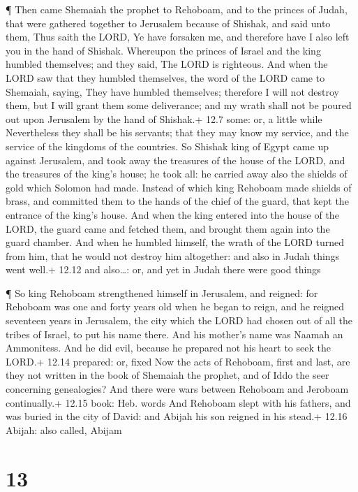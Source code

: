  ¶ Then came Shemaiah the prophet to Rehoboam, and to the
princes of Judah, that were gathered together to Jerusalem because of
Shishak, and said unto them, Thus saith the LORD, Ye have forsaken me,
and therefore have I also left you in the hand of Shishak. 
Whereupon the princes of Israel and the king humbled themselves; and
they said, The LORD is righteous.  And when the LORD saw
that they humbled themselves, the word of the LORD came to Shemaiah,
saying, They have humbled themselves; therefore I will not destroy them,
but I will grant them some deliverance; and my wrath shall not be poured
out upon Jerusalem by the hand of Shishak.+ 12.7 some: or, a little
while  Nevertheless they shall be his servants; that they
may know my service, and the service of the kingdoms of the countries.
 So Shishak king of Egypt came up against Jerusalem, and
took away the treasures of the house of the LORD, and the treasures of
the king's house; he took all: he carried away also the shields of gold
which Solomon had made.  Instead of which king Rehoboam
made shields of brass, and committed them to the hands of the chief of
the guard, that kept the entrance of the king's house.  And
when the king entered into the house of the LORD, the guard came and
fetched them, and brought them again into the guard chamber.
 And when he humbled himself, the wrath of the LORD turned
from him, that he would not destroy him altogether: and also in Judah
things went well.+ 12.12 and also\ldots: or, and yet in Judah there were
good things

 ¶ So king Rehoboam strengthened himself in Jerusalem, and
reigned: for Rehoboam was one and forty years old when he began to
reign, and he reigned seventeen years in Jerusalem, the city which the
LORD had chosen out of all the tribes of Israel, to put his name there.
And his mother's name was Naamah an Ammonitess.  And he did
evil, because he prepared not his heart to seek the LORD.+ 12.14
prepared: or, fixed  Now the acts of Rehoboam, first and
last, are they not written in the book of Shemaiah the prophet, and of
Iddo the seer concerning genealogies? And there were wars between
Rehoboam and Jeroboam continually.+ 12.15 book: Heb. words 
And Rehoboam slept with his fathers, and was buried in the city of
David: and Abijah his son reigned in his stead.+ 12.16 Abijah: also
called, Abijam

\hypertarget{section-12}{%
\section{13}\label{section-12}}

